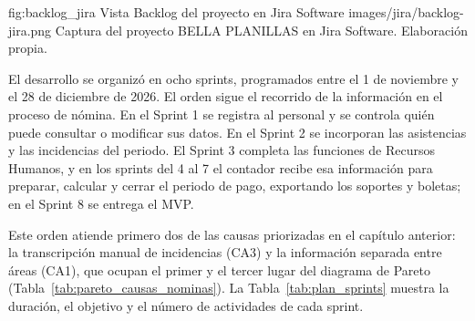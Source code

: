 \figuraEnTexto
    {fig:backlog_jira}
    {Vista Backlog del proyecto en Jira Software}
    {images/jira/backlog-jira.png}
    {Captura del proyecto BELLA PLANILLAS en Jira Software. Elaboración propia.}


El desarrollo se organizó en ocho sprints, programados entre el 1 de noviembre y el 28 de diciembre de 2026. 
El orden sigue el recorrido de la información en el proceso de nómina. En el Sprint 1 se registra al personal y 
se controla quién puede consultar o modificar sus datos. 
En el Sprint 2 se incorporan las asistencias y las incidencias del periodo. 
El Sprint 3 completa las funciones de Recursos Humanos, 
y en los sprints del 4 al 7 el contador recibe esa información para preparar, 
calcular y cerrar el periodo de pago, exportando los soportes y boletas; en el Sprint 8 se entrega el MVP.

Este orden atiende primero dos de las causas priorizadas en el capítulo anterior: la transcripción manual de incidencias (CA3) 
y la información separada entre áreas (CA1), 
que ocupan el primer y el tercer lugar del diagrama de Pareto (Tabla~\ref{tab:pareto_causas_nominas}). 
La Tabla~\ref{tab:plan_sprints} muestra la duración, el objetivo y el número de actividades de cada sprint.

